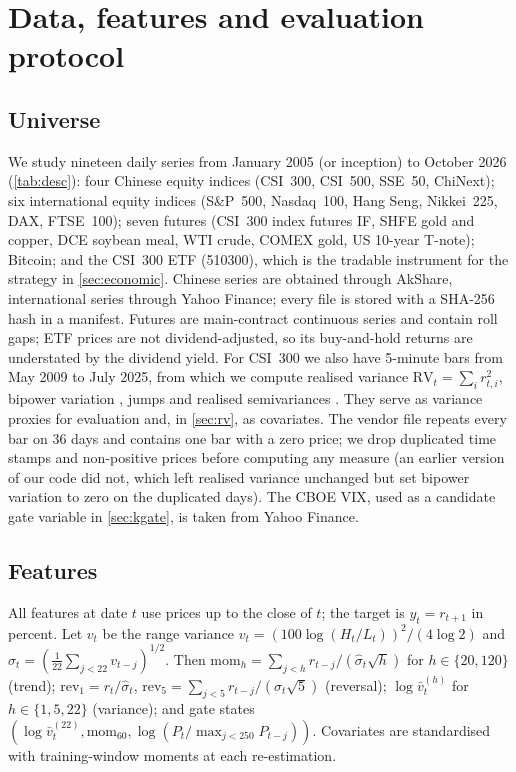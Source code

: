 \section{Data, features and evaluation protocol}\label{sec:data}

\subsection{Universe}
We study nineteen daily series from January 2005 (or inception) to October 2026
(\cref{tab:desc}): four Chinese equity indices (CSI~300, CSI~500, SSE~50, ChiNext); six international
equity indices (S\&P~500, Nasdaq~100, Hang Seng, Nikkei~225, DAX, FTSE~100); seven futures
(CSI~300 index futures IF, SHFE gold and copper, DCE soybean meal, WTI crude, COMEX gold, US 10-year
T-note); Bitcoin; and the CSI~300 ETF (510300), which is the tradable instrument for the strategy in
\cref{sec:economic}. Chinese series are obtained through AkShare, international series through Yahoo
Finance; every file is stored with a SHA-256 hash in a manifest. Futures are main-contract continuous
series and contain roll gaps; ETF prices are not dividend-adjusted, so its buy-and-hold returns are
understated by the dividend yield. For CSI~300 we also have 5-minute bars from May 2009 to July 2025,
from which we compute realised variance $\mathrm{RV}_t=\sum_ir_{t,i}^2$, bipower variation
\citep{barndorff2004power}, jumps and realised semivariances \citep{patton2015good}. They serve as
variance proxies for evaluation \citep{andersen2003modeling} and, in \cref{sec:rv}, as covariates.
The vendor file repeats every bar on 36 days and contains one bar with a zero price; we drop
duplicated time stamps and non-positive prices before computing any measure (an earlier version
of our code did not, which left realised variance unchanged but set bipower variation to zero on the
duplicated days). The CBOE VIX, used as a candidate gate variable in \cref{sec:kgate}, is taken from
Yahoo Finance.

\subsection{Features}
All features at date $t$ use prices up to the close of $t$; the target is $y_t=r_{t+1}$ in percent.
Let $v_t$ be the \citet{parkinson1980extreme} range variance
$v_t=(100\log(H_t/L_t))^2/(4\log 2)$ and $\hat\sigma_t=(\frac1{22}\sum_{j<22}v_{t-j})^{1/2}$. Then
$\mathrm{mom}_h=\sum_{j<h}r_{t-j}/(\hat\sigma_t\sqrt h)$ for $h\in\{20,120\}$ (trend);
$\mathrm{rev}_1=r_t/\hat\sigma_t$, $\mathrm{rev}_5=\sum_{j<5}r_{t-j}/(\hat\sigma_t\sqrt5)$ (reversal);
$\log\bar v^{(h)}_t$ for $h\in\{1,5,22\}$ (variance); and gate states
$(\log\bar v^{(22)}_t,\mathrm{mom}_{60},\log(P_t/\max_{j<250}P_{t-j}))$. Covariates are standardised
with training-window moments at each re-estimation.


